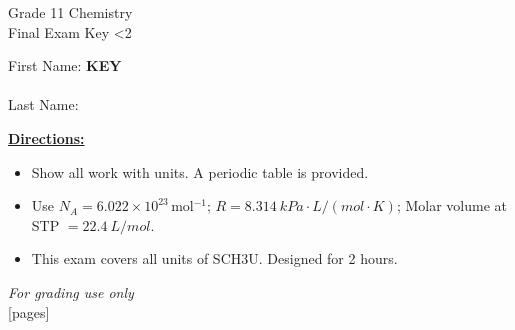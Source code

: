 \documentclass[addpoints]{exam}
\newcommand{\event}{Final Exam}
\newcommand{\tournament}{}
\def\type{0}
\begin{document}
\begin{center}
    {\huge Grade 11 Chemistry \\ \event
    \ifprintanswers \space Key
    \else \space \ifnum\type<2 \fi
    \fi \\ \vspace{3mm}\tournament\vspace{1mm}}
\end{center}

\vspace{.20\textheight}

\begin{center}
    First Name: \ifprintanswers
    \underline{\hspace{3.5cm}}\textbf{KEY}\underline{\hspace{5.5cm}}\\\vspace{5mm}
    \else \underline{\hspace{10cm}}\\ \vspace{5mm} \fi
    Last Name: \underline{\hspace{10cm}}\\ \vspace{5mm}
\end{center}

\noindent\textbf{\underline{Directions:}}
\begin{itemize}
    \item Show all work with units. A periodic table is provided.
    \item Use $N_A = 6.022\times10^{23}$\,mol$^{-1}$;\;
    $R = \SI{8.314}{kPa\cdot L/(mol\cdot K)}$;\;
    Molar volume at STP $= \SI{22.4}{L/mol}$.
    \item This exam covers all units of SCH3U. Designed for 2 hours.
\end{itemize}
\begin{center}
\textit{For grading use only}\\
[pages]
\end{center}
\end{document}
